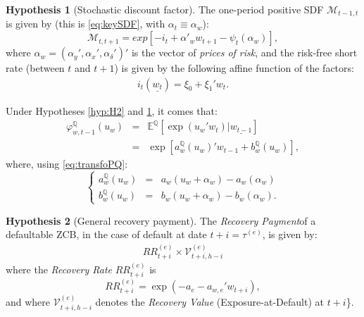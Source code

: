\documentclass[
  12pt,
]{book}
\theoremstyle{definition}
\theoremstyle{definition}
\theoremstyle{definition}
\theoremstyle{definition}
\newtheorem{hypothesis}{Hypothesis}[chapter]
\theoremstyle{remark}
\begin{document}
\begin{hypothesis}[Stochastic discount factor]
\protect\hypertarget{hyp:H4}{}\label{hyp:H4}The one-period positive SDF \(\mathcal{M}_{t-1, t}\) is given by (this is \eqref{eq:keySDF}, with \(\alpha_t \equiv \alpha_w\)):
\begin{equation}
\mathcal{M}_{t,t+1} = exp[-i_{t}+\alpha'_w w_{t+1}-\psi_t(\alpha_w)],
\end{equation}
where \(\alpha_w = (\alpha_y ' , \alpha_x ' , \alpha_{\delta} ') '\) is the vector of \emph{prices of risk}, and the risk-free short rate (between \(t\) and \(t+1\)) is given by the following affine function of the factors:
\begin{equation}
\begin{array}{lll}
i_{t}(\underline{w_{t}}) = \xi_0 + \xi_1 ' w_{t}.
\end{array}\label{eq:shortrate}
\end{equation}
\end{hypothesis}

Under Hypotheses \ref{hyp:H2} and \ref{hyp:H4}, it comes that:
\begin{eqnarray}
\varphi^{\mathbb{Q}}_{w, t-1} (u_w) &=& \mathbb{E}^{\mathbb{Q}} \left[\exp( u_w ' w_t )   |   \underline{w_{t-1}} \right] \nonumber \\
&=& \exp \left[ a^{\mathbb{Q}}_{w} (u_{w}) ' w_{t-1} + b^{\mathbb{Q}}_{w} (u_{w}) \right],\label{eq:affineQcLT}
\end{eqnarray}
where, using \eqref{eq:transfoPQ}:
\begin{equation}
\left\{
\begin{array}{ccl}
a^{\mathbb{Q}}_{w} (u_{w}) &=& a_{w} (u_{w} + \alpha_w) - a_{w} (\alpha_w) \\
b^{\mathbb{Q}}_{w} (u_{w}) &=& b_{w} (u_{w} + \alpha_w) - b_{w} (\alpha_w).
\end{array}
\right.\label{eq:aQbQ}
\end{equation}

\begin{hypothesis}[General recovery payment]
\protect\hypertarget{hyp:RRvalue}{}\label{hyp:RRvalue}The \emph{Recovery Payment}of a defaultable ZCB, in the case of default at date \(t+i = \tau^{(e)}\), is given by:
\begin{equation}
\begin{array}{lll}
RR^{(e)}_{t+i}   \times   \mathcal{V}^{(e)}_{t+i, h-i}
\end{array}\label{eq:recoverypaym}
\end{equation}
where the \emph{Recovery Rate} \(RR^{(e)}_{t+i}\) is
\begin{equation}
RR^{(e)}_{t+i} = \exp \left( - a_{e} - a_{w, e} '   w_{t+i} \right),\label{eq:recoveryrate2}
\end{equation}
and where \(\mathcal{V}^{(e)}_{t+i, h-i}\) denotes the \emph{Recovery Value} (Exposure-at-Default) at \(t+i\)\}.
\end{hypothesis}
\end{document}
